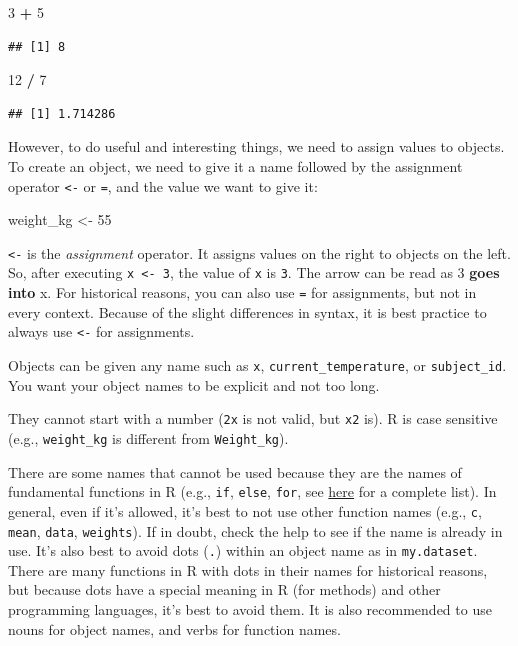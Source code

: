 \documentclass[
]{book}
\newenvironment{Shaded}{\begin{snugshade}}{\end{snugshade}}
\newcommand{\DecValTok}[1]{\textcolor[rgb]{0.00,0.00,0.81}{#1}}
\newcommand{\NormalTok}[1]{#1}
\newcommand{\OtherTok}[1]{\textcolor[rgb]{0.56,0.35,0.01}{#1}}
\newcommand{\SpecialCharTok}[1]{\textcolor[rgb]{0.81,0.36,0.00}{\textbf{#1}}}
\begin{document}
\begin{Shaded}
\begin{Highlighting}[]
\DecValTok{3} \SpecialCharTok{+} \DecValTok{5}
\end{Highlighting}
\end{Shaded}

\begin{verbatim}
## [1] 8
\end{verbatim}

\begin{Shaded}
\begin{Highlighting}[]
\DecValTok{12} \SpecialCharTok{/} \DecValTok{7}
\end{Highlighting}
\end{Shaded}

\begin{verbatim}
## [1] 1.714286
\end{verbatim}

However, to do useful and interesting things, we need to assign values to objects. To create an object, we need to give it a name followed by the assignment operator \texttt{\textless{}-} or \texttt{=}, and the value we want to give it:

\begin{Shaded}
\begin{Highlighting}[]
\NormalTok{weight\_kg }\OtherTok{\textless{}{-}} \DecValTok{55}
\end{Highlighting}
\end{Shaded}

\texttt{\textless{}-} is the \emph{assignment} operator. It assigns values on the right to objects on the left. So, after executing \texttt{x\ \textless{}-\ 3}, the value of \texttt{x} is \texttt{3}. The arrow can be read as 3 \textbf{goes into} x. For historical reasons, you can also use \texttt{=} for assignments, but not in every context. Because of the slight differences in syntax, it is best practice to always use \texttt{\textless{}-} for assignments.

Objects can be given any name such as \texttt{x}, \texttt{current\_temperature}, or \texttt{subject\_id}. You want your object names to be explicit and not too long.

They cannot start with a number (\texttt{2x} is not valid, but \texttt{x2} is). R is case sensitive (e.g., \texttt{weight\_kg} is different from \texttt{Weight\_kg}).

There are some names that cannot be used because they are the names of fundamental functions in R (e.g., \texttt{if}, \texttt{else}, \texttt{for}, see \href{https://stat.ethz.ch/R-manual/R-devel/library/base/html/Reserved.html}{here} for a complete list). In general, even if it's allowed, it's best to not use other function names (e.g., \texttt{c}, \texttt{mean}, \texttt{data}, \texttt{weights}). If in doubt, check the help to see if the name is already in use. It's also best to avoid dots (\texttt{.}) within an object name as in \texttt{my.dataset}. There are many functions in R with dots in their names for historical reasons, but because dots have a special meaning in R (for methods) and other programming languages, it's best to avoid them. It is also recommended to use nouns for object names, and verbs for function names.
\end{document}
